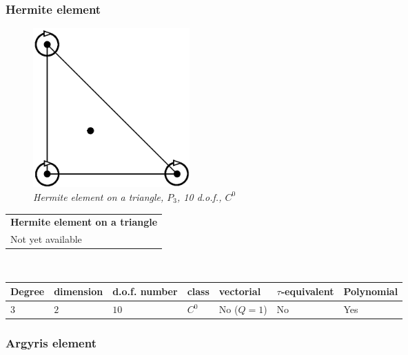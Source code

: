 \documentclass[11pt,a4paper]{article}
\begin{document}
\subsubsection{Hermite element}

\begin{figure}[H]
  \begin{center}
    \includegraphics[width=6cm,angle=0]{getfemlist_triangle_hermite.eps}
  \end{center}
  \caption{ \it Hermite element on a triangle, $P_3$, 10 d.o.f., $C^0$}
  \label{fig:triangle_hermite}
\end{figure}


\begin{center}
\begin{tabular}{|m{16.11cm}|} \hline 
{ \bf Hermite element on a triangle}\\
Not yet available
\end{tabular} \\ \vspace{-1pt} 
\begin{tabular}{|m{2cm}|m{2cm}|m{2.5cm}|m{1.2cm}|m{2cm}|m{2cm}|m{1.8cm}|} \hline 
Degree & dimension & d.o.f. number & class & vectorial & \mbox{$\tau$-equivalent} & Polynomial\\ \hline
$3$ & $2$ & $10$ & $C^0$ & No \mbox{($Q = 1$)} & No & Yes\\ \hline
\end{tabular}
\end{center}

\subsubsection{Argyris element}
\end{document}
